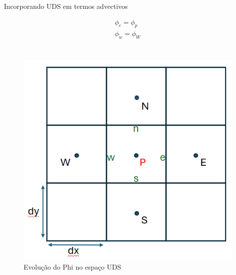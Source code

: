 \documentclass[]{article}
\begin{document}
Incorporando UDS em termos advectivos

\begin{equation}
	\begin{aligned}
		\phi_e = \phi_p\\
		\phi_w = \phi_W\\
	\end{aligned}	
\end{equation}\\

\begin{figure}[H]
	\centering
	\includegraphics[width=.65\textwidth]{Figures/1.png}
	\caption{Evolução do Phi no espaço UDS}
\end{figure}
\end{document}
